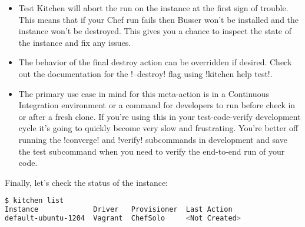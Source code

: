 \begin{itemize}
  \item Test Kitchen will abort the run on the instance at the first sign of trouble. This means that if your Chef run fails then Busser won't be installed and the instance won't be destroyed. This gives you a chance to inspect the state of the instance and fix any issues.
  \item The behavior of the final destroy action can be overridden if desired. Check out the documentation for the \inline!--destroy! flag using \inline!kitchen help test!.
  \item The primary use case in mind for this meta-action is in a Continuous Integration environment or a command for developers to run before check in or after a fresh clone. If you're using this in your test-code-verify development cycle it's going to quickly become very slow and frustrating. You're better off running the \inline!converge! and \inline!verify! subcommands in development and save the test subcommand when you need to verify the end-to-end run of your code.
\end{itemize}

Finally, let's check the status of the instance:

\begin{lstlisting}[language=Bash,label=lst:testing-test-kitchen19]
$ kitchen list
Instance             Driver   Provisioner  Last Action
default-ubuntu-1204  Vagrant  ChefSolo     <Not Created>
\end{lstlisting}